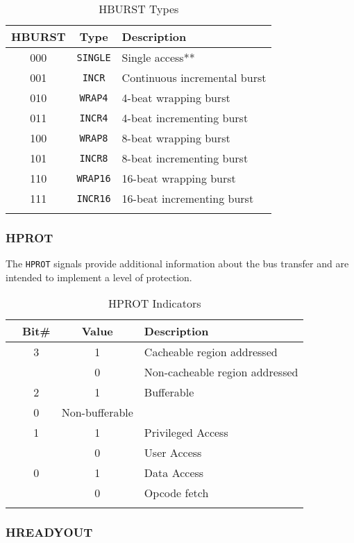 \begin{longtable}[c]{@{\extracolsep{\fill}}ccl}	
		\toprule 
		\textbf{HBURST} & \textbf{Type} & \textbf{Description}\\
		\midrule
		\endhead 
		000 & \texttt{SINGLE} & Single access**\\
		001 & \texttt{INCR} & Continuous incremental burst\\
		010 & \texttt{WRAP4} & 4-beat wrapping burst\\
		011 & \texttt{INCR4} & 4-beat incrementing burst\\
		100 & \texttt{WRAP8} & 8-beat wrapping burst\\
		101 & \texttt{INCR8} & 8-beat incrementing burst\\
		110 & \texttt{WRAP16} & 16-beat wrapping burst\\
		111 & \texttt{INCR16} & 16-beat incrementing burst\\
		\bottomrule 	
	\caption{HBURST Types}
	\label{tab:HBURST}
\end{longtable}

\subsubsection{HPROT}

The \texttt{HPROT} signals provide additional information about the bus
transfer and are intended to implement a level of protection.

\begin{longtable}[c]{@{}lccl}	
		\toprule 
		& \textbf{Bit\#} & \textbf{Value} & \textbf{Description}\\
		\midrule
		\endhead 
		& 3 & 1 & Cacheable region addressed\\
		& & 0 & Non-cacheable region addressed\\
		& 2 & 1 & Bufferable\\
		& 0 & Non-bufferable\\
		& 1 & 1 & Privileged Access\\
		& & 0 & User Access\\
		& 0 & 1 & Data Access\\
		& & 0 & Opcode fetch\\
		\bottomrule 	
	\caption{HPROT Indicators}
	\label{tab:HPROT}
\end{longtable}


\subsubsection{HREADYOUT}

